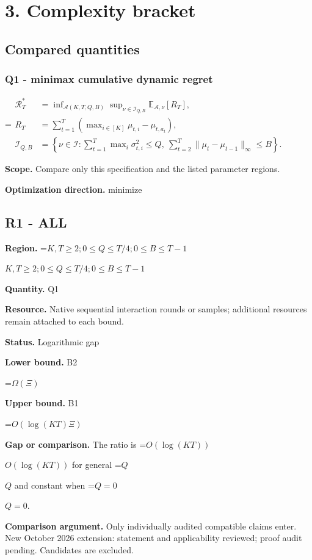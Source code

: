 \documentclass[10pt,a4paper]{article}
\newcommand{\AtlasMath}[1]{\par\begingroup\centering\setbox0=\hbox{$\displaystyle #1$}\ifdim\wd0>1.4\linewidth\typeout{ATLAS WIDE FORMULA: \the\wd0}\fi\ifdim\wd0>\linewidth\resizebox{\linewidth}{!}{\box0}\else\box0\fi\par\endgroup}
\newcommand{\AtlasInlineMath}[1]{\begingroup\setbox0=\hbox{$#1$}\ifdim\wd0>.4\linewidth\endgroup\AtlasMath{#1}\else\endgroup$#1$\fi}
\begin{document}
\section{3. Complexity bracket}
\subsection{Compared quantities}
\subsubsection{Q1 - minimax cumulative dynamic regret}
\AtlasMath{\begin{aligned}\mathcal R_T^*&=\inf_{\mathcal A(K,T,Q,B)}\sup_{\nu\in\mathcal I_{Q,B}}\mathbb E_{\mathcal A,\nu}[R_T],\\ R_T&=\sum_{t=1}^T(\max_{i\in[K]}\mu_{t,i}-\mu_{t,a_t}),\\ \mathcal I_{Q,B}&=\left\{\nu\in\mathcal I:\sum_{t=1}^T\max_i\sigma_{t,i}^2\le Q,\ \sum_{t=2}^T\|\mu_t-\mu_{t-1}\|_\infty\le B\right\}.\end{aligned}}
\textbf{Scope.} Compare only this specification and the listed parameter regions.

\textbf{Optimization direction.} minimize

\subsection{R1 - ALL}
\textbf{Region.} \AtlasInlineMath{K,T\ge 2; 0\le Q\le T/4; 0\le B\le T-1}

\textbf{Quantity.} Q1

\textbf{Resource.} Native sequential interaction rounds or samples; additional resources remain attached to each bound.

\textbf{Status.} Logarithmic gap

\textbf{Lower bound.} B2

\AtlasMath{\Omega(\Xi)}
\textbf{Upper bound.} B1

\AtlasMath{O(\log(KT)\Xi)}
\textbf{Gap or comparison.} The ratio is \AtlasInlineMath{O(\log(KT))} for general \AtlasInlineMath{Q} and constant when \AtlasInlineMath{Q=0}.

\textbf{Comparison argument.} Only individually audited compatible claims enter. New October 2026 extension: statement and applicability reviewed; proof audit pending. Candidates are excluded.
\end{document}
